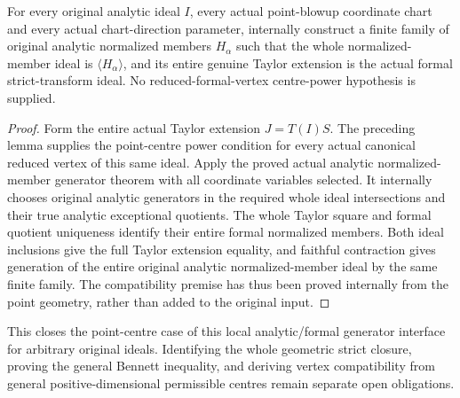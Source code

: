 \begin{theorem}
\label{hir:actual-point-centre-whole-analytic-strict-generators}
\leanok
For every original analytic ideal $I$, every actual point-blowup coordinate
chart and every actual chart-direction parameter, internally construct a
finite family of original analytic normalized members $H_\alpha$ such that
the whole normalized-member ideal is $\langle H_\alpha\rangle$, and its
entire genuine Taylor extension is the actual formal strict-transform ideal.
No reduced-formal-vertex centre-power hypothesis is supplied.
\end{theorem}
\begin{proof}
Form the entire actual Taylor extension $J=T(I)S$. The preceding lemma
supplies the point-centre power condition for every actual canonical
reduced vertex of this same ideal. Apply the proved actual analytic
normalized-member generator theorem with all coordinate variables selected.
It internally chooses original analytic generators in the required whole
ideal intersections and their true analytic exceptional quotients. The
whole Taylor square and formal quotient uniqueness identify their entire
formal normalized members. Both ideal inclusions give the full Taylor
extension equality, and faithful contraction gives generation of the entire
original analytic normalized-member ideal by the same finite family.
The compatibility premise has thus been proved internally from the point
geometry, rather than added to the original input.
\end{proof}

This closes the point-centre case of this local analytic/formal generator
interface for arbitrary original ideals. Identifying the whole geometric
strict closure, proving the general Bennett inequality, and deriving
vertex compatibility from general positive-dimensional permissible centres
remain separate open obligations.
